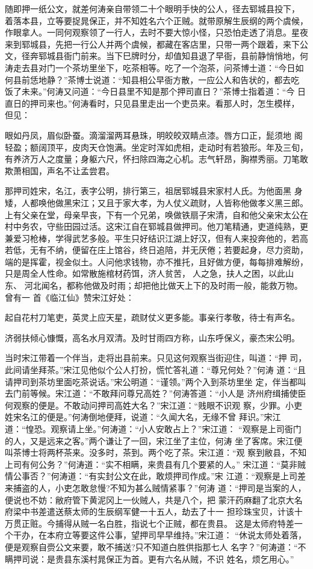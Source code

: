 随即押一纸公文，就差何涛亲自带领二十个眼明手快的公人，径去郓城县投下，
着落本县，立等要捉晁保正，并不知姓名六个正贼。就带原解生辰纲的两个虞候，
作眼拿人。一同何观察领了一行人，去时不要大惊小怪，只恐怕走透了消息。星夜
来到郓城县，先把一行公人并两个虞候，都藏在客店里，只带一两个跟着，来下公
文，径奔郓城县衙门前来。当下巳牌时分，却值知县退了早衙，县前静悄悄地，何
涛走去县对门一个茶坊里坐下，吃茶相等。吃了一个泡茶，问茶博士道：“今日如
何县前恁地静？”茶博士说道：“知县相公早衙方散，一应公人和告状的，都去吃
饭了未来。”何涛又问道：“今日县里不知是那个押司直日？”茶博士指着道：“今
日直日的押司来也。”何涛看时，只见县里走出一个吏员来。看那人时，怎生模样，
但见：

眼如丹凤，眉似卧蚕。滴溜溜两耳悬珠，明皎皎双睛点漆。唇方口正，髭须地
阁轻盈；额阔顶平，皮肉天仓饱满。坐定时浑如虎相，走动时有若狼形。年及三旬，
有养济万人之度量；身躯六尺，怀扫除四海之心机。志气轩昂，胸襟秀丽。刀笔敢
欺萧相国，声名不让孟尝君。

那押司姓宋，名江，表字公明，排行第三，祖居郓城县宋家村人氏。为他面黑
身矮，人都唤他做黑宋江；又且于家大孝，为人仗义疏财，人皆称他做孝义黑三郎。
上有父亲在堂，母亲早丧，下有一个兄弟，唤做铁扇子宋清，自和他父亲宋太公在
村中务农，守些田园过活。这宋江自在郓城县做押司。他刀笔精通，吏道纯熟，更
兼爱习枪棒，学得武艺多般。平生只好结识江湖上好汉，但有人来投奔他的，若高
若低，无有不纳，便留在庄上馆谷，终日追陪，并无厌倦；若要起身，尽力资助，
端的是挥霍，视金似土。人问他求钱物，亦不推托，且好做方便，每每排难解纷，
只是周全人性命。如常散施棺材药饵，济人贫苦，人之急，扶人之困，以此山东、
河北闻名，都称他做及时雨；却把他比做天上下的及时雨一般，能救万物。曾有一
首《临江仙》赞宋江好处：

起自花村刀笔吏，英灵上应天星，疏财仗义更多能。事亲行孝敬，待士有声名。

济弱扶倾心慷慨，高名水月双清。及时甘雨四方称，山东呼保义，豪杰宋公明。

当时宋江带着一个伴当，走将出县前来。只见这何观察当街迎住，叫道：“押
司，此间请坐拜茶。”宋江见他似个公人打扮，慌忙答礼道：“尊兄何处？”何涛
道：“且请押司到茶坊里面吃茶说话。”宋公明道：“谨领。”两个入到茶坊里坐
定，伴当都叫去门前等候。宋江道：“不敢拜问尊兄高姓？”何涛答道：“小人是
济州府缉捕使臣何观察的便是。不敢动问押司高姓大名？”宋江道：“贱眼不识观
察，少罪。小吏姓宋名江的便是。”何涛倒地便拜，说道：“久闻大名，无缘不曾
拜识。”宋江道：“惶恐。观察请上坐。”何涛道：“小人安敢占上？”宋江道：
“观察是上司衙门的人，又是远来之客。”两个谦让了一回，宋江坐了主位，何涛
坐了客席。宋江便叫茶博士将两杯茶来。没多时，茶到。两个吃了茶。宋江道：“观
察到敝县，不知上司有何公务？”何涛道：“实不相瞒，来贵县有几个要紧的人。”
宋江道：“莫非贼情公事否？”何涛道：“有实封公文在此，敢烦押司作成。”宋
江道：“观察是上司差来捕盗的人，小吏怎敢怠慢?不知为甚么贼情紧事？”何涛
道：“押司是当案的人，便说也不妨：敝府管下黄泥冈上一伙贼人，共是八个，把
蒙汗药麻翻了北京大名府梁中书差遣送蔡太师的生辰纲军健一十五人，劫去了十一
担珍珠宝贝，计该十万贯正赃。今捕得从贼一名白胜，指说七个正贼，都在贵县。
这是太师府特差一个干办，在本府立等要这件公事，望押司早早维持。”宋江道：
“休说太师处着落，便是观察自赍公文来要，敢不捕送?只不知道白胜供指那七人
名字？”何涛道：“不瞒押司说：是贵县东溪村晁保正为首。更有六名从贼，不识
姓名，烦乞用心。”

